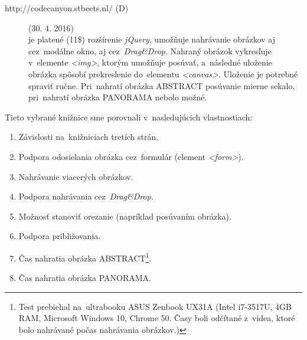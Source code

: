 \begin{description}
	
	\item[http://codecanyon.stbeets.nl/ (D)](30. 4. 2016)\\
	je platené (11\$) rozšírenie \emph{jQuery}, umožňuje nahrávanie obrázkov aj cez~modálne okno, aj cez~\emph{Drag\&Drop}. Nahraný obrázok vykresľuje v~elemente \emph{<img>}, ktorým umožňuje posúvať, a~následné uloženie obrázka spôsobí prekreslenie do~elementu \emph{<canvas>}. Uloženie je potrebné spraviť ručne. Pri~nahratí obrázka ABSTRACT posúvanie mierne sekalo, pri~nahratí obrázka PANORAMA nebolo možné.

\end{description}

Tieto vybrané knižnice sme porovnali v~nasledujúcich vlastnostiach:
\begin{enumerate}
	\item Závislosti na~knižniciach tretích strán.
	\item Podpora odosielania obrázka cez~formulár (element \emph{<form>}).
	\item Nahrávanie viacerých obrázkov.
	\item Podpora nahrávania cez~\emph{Drag\&Drop}.
	\item Možnosť stanoviť orezanie (napríklad posúvaním obrázka).
	\item Podpora približovania.
	\item Čas nahratia obrázka ABSTRACT\footnote{Test prebiehal na~ultrabooku ASUS Zenbook UX31A (Intel i7-3517U, 4GB RAM, Microsoft Windows 10, Chrome 50. Časy boli odčítané z~videa, ktoré bolo nahrávané počas nahrávania obrázkov.) }.
	\item Čas nahratia obrázka PANORAMA\footnotemark[\value{footnote}].
\end{enumerate}

